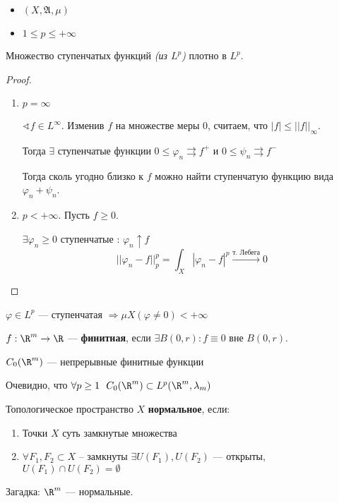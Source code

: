 \begin{lemma}\itemfix
    \begin{itemize}
        \item \((X, \mathfrak{A}, \mu)\)
        \item \(1 \leq p \leq +\infty\)
    \end{itemize}

    Множество ступенчатых функций \textit{(из \(L^p\))} плотно в \(L^p\).
\end{lemma}
\begin{proof}\itemfix
    \begin{enumerate}
        \item \(p = \infty\)

              \(\sphericalangle f\in L^{\infty}\). Изменив \(f\) на множестве меры \(0\), считаем, что \(|f| \leq ||f||_\infty\).

              Тогда \(\exists \) ступенчатые функции \(0 \leq \varphi_n \rightrightarrows f^{ +}\) и \(0 \leq \psi_n \rightrightarrows f^{ -}\)


              Тогда сколь угодно близко к \(f\) можно найти ступенчатую функцию вида \(\varphi_n + \psi_n\).

        \item \(p < +\infty\). Пусть \(f \geq 0\).

              \(\exists \varphi_{n} \geq 0\) ступенчатые : \(\varphi_n \uparrow f\)
              \[||\varphi_n - f||_p^p = \int_X |\varphi_n - f|^p \xrightarrow{\text{т. Лебега}} 0\]
    \end{enumerate}
\end{proof}
\begin{remark}
    \(\varphi \in L^p\) --- ступенчатая \( \Rightarrow \mu X (\varphi \neq 0) < +\infty\)
\end{remark}

\begin{definition}
    \(f : \R^m \to \R\) --- \textbf{финитная}, если \(\exists B(0, r) : f\equiv 0\) вне \(B(0, r)\).
\end{definition}

\begin{obozn}
    \(C_0(\R^m)\) --- непрерывные финитные функции
\end{obozn}

Очевидно, что \(\forall p \geq 1 \ \ C_0(\R^m) \subset L^p(\R^m, \lambda_m)\)

\begin{definition}
    Топологическое пространство \(X\) \textbf{нормальное}, если:
    \begin{enumerate}
        \item Точки \(X\) суть замкнутые множества
        \item \(\forall F_1, F_2 \subset X\) -- замкнуты \(\exists U(F_1), U(F_2)\) --- открыты, \(U(F_1) \cap U(F_2) = \emptyset\)
    \end{enumerate}
\end{definition}

Загадка: \(\R^m\) --- нормальные.


